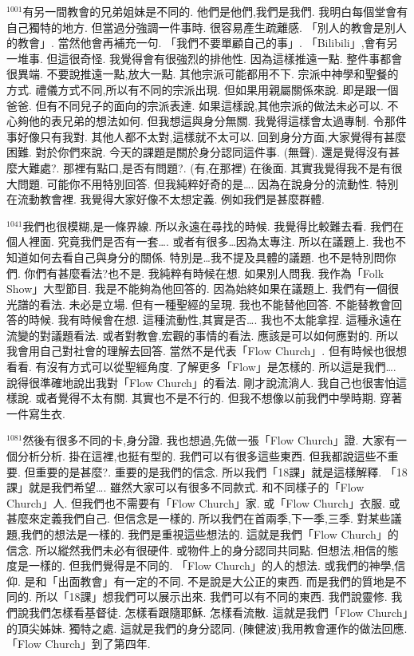 \documentclass{book}
\begin{document}
$^{1001}$有另一間教會的兄弟姐妹是不同的.
他們是他們,我們是我們.
我明白每個堂會有自己獨特的地方.
但當過分強調一件事時.
很容易產生疏離感.
「別人的教會是別人的教會」.
當然他會再補充一句.
「我們不要單顧自己的事」.
「Bilibili」,會有另一堆事.
但這很奇怪.
我覺得會有很強烈的排他性.
因為這樣推遠一點.
整件事都會很異端.
不要說推遠一點,放大一點.
其他宗派可能都用不下.
宗派中神學和聖餐的方式.
禮儀方式不同,所以有不同的宗派出現.
但如果用親屬關係來說.
即是跟一個爸爸.
但有不同兒子的面向的宗派表達.
如果這樣說,其他宗派的做法未必可以.
不心夠他的表兄弟的想法如何.
但我想這與身分無關.
我覺得這樣會太過專制.
令那件事好像只有我對.
其他人都不太對,這樣就不太可以.
回到身分方面,大家覺得有甚麼困難.
對於你們來說.
今天的課題是關於身分認同這件事.
(無聲).
還是覺得沒有甚麼大難處?.
那裡有點口,是否有問題?.
(有,在那裡) 在後面.
其實我覺得我不是有很大問題.
可能你不用特別回答.
但我純粹好奇的是….
因為在說身分的流動性.
特別在流動教會裡.
我覺得大家好像不太想定義.
例如我們是甚麼群體.

$^{1041}$我們也很模糊,是一條界線.
所以永遠在尋找的時候.
我覺得比較難去看.
我們在個人裡面.
究竟我們是否有一套….
或者有很多…因為太專注.
所以在議題上.
我也不知道如何去看自己與身分的關係.
特別是…我不提及具體的議題.
也不是特別問你們.
你們有甚麼看法?也不是.
我純粹有時候在想.
如果別人問我.
我作為「Folk Show」大型節目.
我是不能夠為他回答的.
因為始終如果在議題上.
我們有一個很光譜的看法.
未必是立場.
但有一種聖經的呈現.
我也不能替他回答.
不能替教會回答的時候.
我有時候會在想.
這種流動性,其實是否….
我也不太能拿捏.
這種永遠在流變的對議題看法.
或者對教會,宏觀的事情的看法.
應該是可以如何應對的.
所以我會用自己對社會的理解去回答.
當然不是代表「Flow Church」.
但有時候也很想看看.
有沒有方式可以從聖經角度.
了解更多「Flow」是怎樣的.
所以這是我們….
說得很準確地說出我對「Flow Church」的看法.
剛才說流淌人.
我自己也很害怕這樣說.
或者覺得不太有關.
其實也不是不行的.
但我不想像以前我們中學時期.
穿著一件寫生衣.

$^{1081}$然後有很多不同的卡,身分證.
我也想過,先做一張「Flow Church」證.
大家有一個分析分析.
掛在這裡,也挺有型的.
我們可以有很多這些東西.
但我都說這些不重要.
但重要的是甚麼?.
重要的是我們的信念.
所以我們「18課」就是這樣解釋.
「18課」就是我們希望….
雖然大家可以有很多不同款式.
和不同樣子的「Flow Church」人.
但我們也不需要有「Flow Church」家.
或「Flow Church」衣服.
或甚麼來定義我們自己.
但信念是一樣的.
所以我們在首兩季,下一季,三季.
對某些議題,我們的想法是一樣的.
我們是重視這些想法的.
這就是我們「Flow Church」的信念.
所以縱然我們未必有很硬件.
或物件上的身分認同共同點.
但想法,相信的態度是一樣的.
但我們覺得是不同的.
「Flow Church」的人的想法.
或我們的神學,信仰.
是和「出面教會」有一定的不同.
不是說是大公正的東西.
而是我們的質地是不同的.
所以「18課」想我們可以展示出來.
我們可以有不同的東西.
我們說靈修.
我們說我們怎樣看基督徒.
怎樣看跟隨耶穌.
怎樣看流散.
這就是我們「Flow Church」的頂尖姊妹.
獨特之處.
這就是我們的身分認同.
(陳健波)我用教會運作的做法回應.
「Flow Church」到了第四年.
\end{document}
